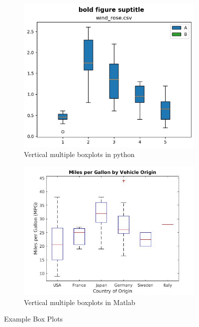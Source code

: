 \documentclass[12pt, a4paper,oneside]{report}
\begin{document}
\begin{figure}
	\begin{subfigure}{.5\textwidth}
		\centering
		\includegraphics[width=.8\linewidth]{box1}
		\caption{Vertical multiple boxplots in python}
		\label{fig:sfig3}
	\end{subfigure}%
	\begin{subfigure}{.5\textwidth}
		\centering
		\includegraphics[width=.8\linewidth]{box2}
		\caption{Vertical multiple boxplots in Matlab}
		\label{fig:sfig3}
	\end{subfigure}
	\caption{Example Box Plots}
	\label{fig:figbox}
\end{figure}
\end{document}
